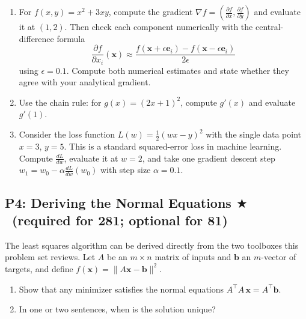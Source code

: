 \documentclass[11pt]{article}
\newcommand{\lr}{\alpha}                %
\newcommand{\gradstar}{$\bigstar$~\textsf{\small (required for 281; optional for 81)}~}
\newenvironment{studentanswer}[1]
  {\par\noindent\begin{minipage}[t][#1][t]{\linewidth}\ignorespaces}
  {\end{minipage}\par}
\begin{document}
\begin{enumerate}[label=\alph*)]
\item For $f(x, y) = x^2 + 3xy$, compute the gradient
$\nabla f = \left(\tfrac{\partial f}{\partial x},
\tfrac{\partial f}{\partial y}\right)$ and evaluate it at $(1, 2)$.
Then check each component numerically with the central-difference formula
\[
\frac{\partial f}{\partial x_i}(\mathbf{x}) \approx
\frac{f(\mathbf{x}+\epsilon\mathbf{e}_i)-
f(\mathbf{x}-\epsilon\mathbf{e}_i)}{2\epsilon}
\]
using $\epsilon=0.1$.
Compute both numerical estimates and state whether they agree with your
analytical gradient.

\begin{studentanswer}{4cm}
\end{studentanswer}

\item Use the chain rule: for $g(x) = (2x + 1)^2$, compute $g'(x)$ and evaluate $g'(1)$.

\begin{studentanswer}{4cm}
\end{studentanswer}

\item Consider the loss function $L(w) = \tfrac{1}{2}(wx - y)^2$ with the single data point $x = 3$, $y = 5$. This is a standard squared-error loss in machine learning. Compute $\tfrac{dL}{dw}$, evaluate it at $w = 2$, and take one gradient descent step $w_1 = w_0 - \lr \tfrac{dL}{dw}(w_0)$ with step size $\lr = 0.1$.

\begin{studentanswer}{5cm}
\end{studentanswer}

\end{enumerate}

\newpage
\subsection*{P4: Deriving the Normal Equations \gradstar}

The least squares algorithm can be derived directly from the two toolboxes this problem set reviews. Let $A$ be an $m \times n$ matrix of inputs and $\mathbf{b}$ an $m$-vector of targets, and define $f(\mathbf{x}) = \|A\mathbf{x} - \mathbf{b}\|^2$.

\begin{enumerate}[label=\alph*)]
\item Show that any minimizer satisfies the normal equations $A^\top A\,\mathbf{x} = A^\top \mathbf{b}$.

\begin{studentanswer}{8cm}
\end{studentanswer}

\item In one or two sentences, when is the solution unique?

\begin{studentanswer}{3cm}
\end{studentanswer}

\end{enumerate}
\end{document}

